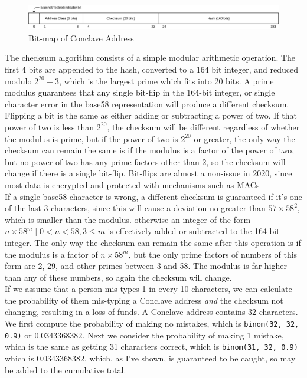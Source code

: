 \documentclass{report}
\begin{document}
				\begin{figure}[H]
					\begin{center}
					\includegraphics[width=400pt]{img/conclave_address.png}
					\end{center}
					\caption{Bit-map of Conclave Address}
					\label{fig:addressBitmap}
				\end{figure}

			The checksum algorithm consists of a simple modular arithmetic operation. The first 4 bits are appended to the hash, converted to a 164 bit integer, and reduced modulo $2^{20}-3$, which is the largest prime which fits into 20 bits. A prime modulus guarantees that any single bit-flip in the 164-bit integer, or single character error in the base58 representation will produce a different checksum.
			Flipping a bit is the same as either adding or subtracting a power of two.  If that power of two is less than $2^{20}$, the checksum will be different regardless of whether the modulus is prime, but if the power of two is $2^{20}$ or greater, the only way the checksum can remain the same is if the modulus is a factor of the power of two, but no power of two has any prime factors other than 2, so the checksum will change if there is a single bit-flip.  Bit-flips  are almost a non-issue in 2020, since most data is encrypted and protected with mechanisms such as MACs \\	
			
			 If a single base58 character is wrong, a different checksum is guaranteed if it's one of the last 3 characters, since this will cause a deviation no greater than $57 \times 58^2$, which is smaller than the modulus. otherwise an integer of the form $n \times 58^{m} \mid 0 < n < 58, 3 \le m$ is effectively added or subtracted to the 164-bit integer. The only way the checksum can remain the same after this operation is if the modulus is a factor of $n \times 58^{m}$, but the only prime factors  of numbers of this form are 2, 29, and other primes between 3 and 58. The modulus is far higher than any of these numbers, so again the checksum will change. \\
			 
			 If we assume that a person mis-types 1 in every 10 characters, we can calculate the probability of them mis-typing a Conclave address \textit{and} the checksum not changing, resulting in a loss of funds. A Conclave address contains 32 characters. We first compute the probability  of making no mistakes, which is \texttt{binom(32, 32, 0.9)} or $0.0343368382$. Next we consider the probability of making 1 mistake, which is the same as getting 31 characters correct, which is \texttt{binom(31, 32, 0.9)} which is $0.0343368382$, which, as I've shown, is guaranteed to be caught, so may be added to the cumulative total. \\
			 
\end{document}
